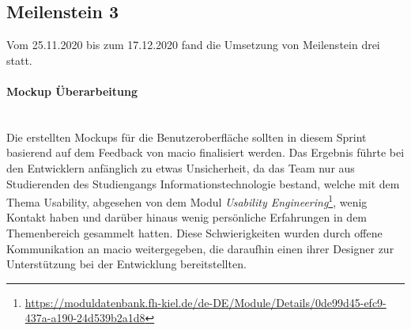 \documentclass[10pt, a4paper]{article}
\begin{document}
\begin{onehalfspace}
\subsection{Meilenstein 3}
Vom 25.11.2020 bis zum 17.12.2020 fand die Umsetzung von Meilenstein drei statt.

\paragraph*{Mockup Überarbeitung} $~$ \\
Die erstellten Mockups für die Benutzeroberfläche sollten in diesem Sprint basierend auf dem Feedback von macio finalisiert werden.
Das Ergebnis führte bei den Entwicklern anfänglich zu etwas Unsicherheit, da das Team nur aus Studierenden des Studiengangs
Informationstechnologie bestand, welche mit dem Thema Usability, abgesehen von dem Modul
\textit{Usability Engineering}\footnote{\raggedright\url{https://moduldatenbank.fh-kiel.de/de-DE/Module/Details/0de99d45-efc9-437a-a190-24d539b2a1d8}},
wenig Kontakt haben und darüber hinaus wenig persönliche Erfahrungen in dem Themenbereich gesammelt hatten.
Diese Schwierigkeiten wurden durch offene Kommunikation an macio weitergegeben,
 die daraufhin einen ihrer Designer zur Unterstützung bei der Entwicklung bereitstellten.


\end{onehalfspace}
\end{document}
